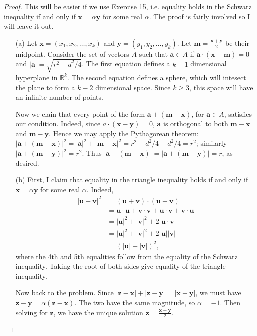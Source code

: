 \documentclass[12pt]{article}
\theoremstyle{remark}
\theoremstyle{named}
\renewcommand{\bf}{\mathbf}
\newcommand{\pvec}[2]{(#1_1, #1_2, \dots, #1_{#2})}
\begin{document}
\begin{proof}
    This will be easier if we use Exercise 15, i.e. equality holds in the Schwarz inequality if and only if $\bf x = \alpha \bf y$ for some real $\alpha$. The proof is fairly involved so I will leave it out. 

    \begin{enumerate}
        \item[(a)] Let $\bf x = \pvec{x}{k}$ and $\bf y = \pvec{y}{k}$. Let $\bf m = \frac{\bf x + \bf y}{2}$ be their midpoint. Consider the set of vectors $A$ such that $\bf a \in A$ if $\bf a \cdot (\bf x - \bf m) = 0$ and $|\bf a| = \sqrt {r^2 - d^2 / 4}$. The first equation defines a $k-1$ dimensional hyperplane in $\mathbb R^k$. The second equation defines a sphere, which will intesect the plane to form a $k-2$ dimensional space. Since $k \ge 3$, this space will have an infinite number of points. 
        
        Now we clain that every point of the form $\bf a + (\bf m - \bf x)$, for $\bf a \in A$, satisfies our condition. Indeed, since $a \cdot (\bf x - \bf y) = 0$, $\bf a$ is orthogonal to both $\bf m - \bf x$ and $\bf m - \bf y$. Hence we may apply the Pythagorean theorem: $|\bf a + (\bf m - \bf x)|^2 = |\bf a|^2 + |\bf m - \bf x|^2 = r^2 - d^2 / 4 + d^2 / 4 = r^2$; similarly $|\bf a + (\bf m - \bf y)|^2 = r^2$. Thus $|\bf a + (\bf m - \bf x)| = |\bf a + (\bf m - \bf y)| = r$, as desired. 
        
        \item[(b)] First, I claim that equality in the triangle inequality holds if and only if $\bf x = \alpha \bf y$ for some real $\alpha$. Indeed, 
        \begin{align*}
            |\bf u + \bf v|^2 &= (\bf u + \bf v) \cdot (\bf u + \bf v) \\
            &= \bf u \cdot \bf u + \bf v \cdot \bf v + \bf u \cdot \bf v + \bf v \cdot \bf u \\
            &= |\bf u|^2 + |\bf v|^2 + 2 |\bf u \cdot \bf v| \\
            &= |\bf u|^ 2 + |\bf v|^2 + 2 |\bf u| |\bf v| \\
            &= (|\bf u| + |\bf v|)^2,
        \end{align*}
        where the 4th and 5th equalities follow from the equality of the Schwarz inequality. Taking the root of both sides give equality of the triangle inequality.

        Now back to the problem. Since $|\bf z - \bf x| + |\bf z - \bf y| = |\bf x - \bf y|$, we must have $\bf z - \bf y = \alpha (\bf z - \bf x)$. The two have the same magnitude, so $\alpha = -1$. Then solving for $\bf z$, we have the unique solution $\bf z = \frac{\bf x + \bf y}{2}$.
        

\end{enumerate}
\end{proof}
\end{document}
